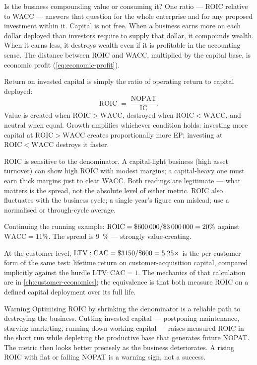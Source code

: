 Is the business compounding value or consuming it? One ratio --- ROIC relative to WACC ---
answers that question for the whole enterprise and for any proposed investment within it.
Capital is not free. When a business earns more on each dollar deployed than investors require to
supply that dollar, it compounds wealth. When it earns less, it destroys wealth even if it is
profitable in the accounting sense. The distance between ROIC and WACC, multiplied by the capital
base, is economic profit (\cref{eq:economic-profit}).

Return on invested capital is simply the ratio of operating return to capital deployed:
\begin{equation}\label{eq:roic}
  \mathrm{ROIC} \;=\; \frac{\mathrm{NOPAT}}{\mathrm{IC}}.
\end{equation}
Value is created when \(\mathrm{ROIC}>\mathrm{WACC}\), destroyed when \(\mathrm{ROIC}<\mathrm{WACC}\),
and neutral when equal. Growth amplifies whichever condition holds: investing more capital at
\(\mathrm{ROIC}>\mathrm{WACC}\) creates proportionally more EP; investing at
\(\mathrm{ROIC}<\mathrm{WACC}\) destroys it faster.

ROIC is sensitive to the denominator. A capital-light business (high asset turnover) can show
high ROIC with modest margins; a capital-heavy one must earn thick margins just to clear WACC.
Both readings are legitimate --- what matters is the spread, not the absolute level of either
metric. ROIC also fluctuates with the business cycle; a single year's figure can mislead; use
a normalised or through-cycle average.

\begin{example}
Continuing the running example: \(\mathrm{ROIC}=\$\num{600000}/\$\num{3000000}=20\%\) against
\(\mathrm{WACC}=11\%\). The spread is \qty{9}{\percent} --- strongly value-creating.

At the customer level, \(\mathrm{LTV}:\mathrm{CAC}=\$\num{3150}/\$\num{600}=5.25\times\)
is the per-customer form of the same test: lifetime return on customer-acquisition capital,
compared implicitly against the hurdle \(\mathrm{LTV}:\mathrm{CAC}=1\). The mechanics of that
calculation are in \cref{ch:customer-economics}; the equivalence is that both measure ROIC on a
defined capital deployment over its full life.
\end{example}

\begin{admonition}{Warning}
Optimising ROIC by shrinking the denominator is a reliable path to destroying the business.
Cutting invested capital --- postponing maintenance, starving marketing, running down working
capital --- raises measured ROIC in the short run while depleting the productive base that
generates future NOPAT. The metric then looks better precisely as the business deteriorates.
A rising ROIC with flat or falling NOPAT is a warning sign, not a success.
\end{admonition}


